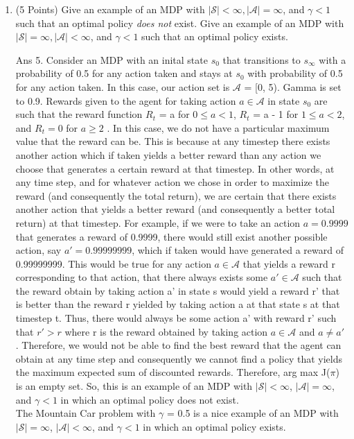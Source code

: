 \documentclass[]{article}
\begin{document}
\begin{enumerate}
    
    \item (5 Points) Give an example of an MDP with $|\mathcal S| < \infty, |\mathcal A| = \infty$, and $\gamma < 1$ such that an optimal policy \emph{does not} exist. Give an example of an MDP with $|\mathcal S| = \infty, |\mathcal A| < \infty$, and $\gamma < 1$ such that an optimal policy exists.

	{
		\color{blue}
			Ans 5. Consider an MDP with an inital state $s_0$ that transitions to $s_\infty$ with a probability of 0.5 for any action taken and stays at $s_0$ with probability of 0.5 for any action taken. In this case, our action set is $\mathcal A$ = [0, 5). Gamma is set to 0.9. Rewards given to the agent for taking action $a \in \mathcal A$ in state $s_0$  are such that the reward function $R_t$ = a for $0 \leq a < 1$, $R_t$ = a - 1 for $1 \leq a < 2$, and $R_t = 0$ for $a \geq 2$ . In this case, we do not have a particular maximum value that the reward can be. This is because at any timestep there exists another action which if taken yields a better reward than any action we choose that generates a certain reward at that timestep. In other words, at any time step, and for whatever action we chose in order to maximize the reward (and consequently the total return), we are certain that there exists another action that yields a better reward (and consequently a better total return) at that timestep. For example, if we were to take an action $a = 0.9999$ that generates a reward of 0.9999, there would still exist another possible action, say $a' = 0.99999999$, which if taken would have generated a reward of 0.99999999.  This would be true for any action $a \in \mathcal A$ that yields a reward r corresponding to that action, that there always exists some $a' \in \mathcal A$ such that the reward obtain by taking action a' in state s would yield a reward r' that is better than the reward r yielded by taking action a at that state s at that timestep t. Thus, there would always be some action a' with reward r' such that $r' > r$ where r is the reward obtained by taking action $a \in \mathcal A$ and $a \ne a'$ . Therefore, we would not be able to find the best reward that the agent can obtain at any time step and consequently we cannot find a policy that yields the maximum expected sum of discounted rewards. Therefore, arg max J($\pi$) is an empty set. So, this is an example of an MDP with $|\mathcal S| < \infty$, $|\mathcal A| = \infty$, and $\gamma < 1$ in which an optimal policy does not exist. \\
			The Mountain Car problem with $\gamma$ = 0.5 is a nice example of an MDP with $|\mathcal S| = \infty$, $|\mathcal A| < \infty$, and $\gamma < 1$ in which an optimal policy exists.
	}
    

\end{enumerate}
\end{document}
